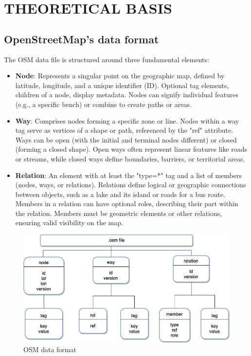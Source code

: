 \section{THEORETICAL BASIS}

\subsection{OpenStreetMap's data format}

The OSM data file is structured around three fundamental elements:

\begin{itemize}
    \item \textbf{Node}: Represents a singular point on the geographic map, defined by latitude, longitude, and a unique identifier (ID). Optional tag elements, children of a node, display metadata. Nodes can signify individual features (e.g., a specific bench) or combine to create paths or areas.
    \item \textbf{Way}: Comprises nodes forming a specific zone or line. Nodes within a way tag serve as vertices of a shape or path, referenced by the "ref" attribute. Ways can be open (with the initial and terminal nodes different) or closed (forming a closed shape). Open ways often represent linear features like roads or streams, while closed ways define boundaries, barriers, or territorial areas.
    \item \textbf{Relation}: An element with at least the "type=*" tag and a list of members (nodes, ways, or relations). Relations define logical or geographic connections between objects, such as a lake and its island or roads for a bus route. Members in a relation can have optional roles, describing their part within the relation. Members must be geometric elements or other relations, ensuring valid visibility on the map.
\end{itemize}

\begin{figure}[H]
    \centering
    \includegraphics[width=\textwidth]{assets/images/Research/System/osm_file_structure.png}
    \caption{OSM data format \cite{osm_file_structure}}
    \label{fig:osm}
\end{figure}


